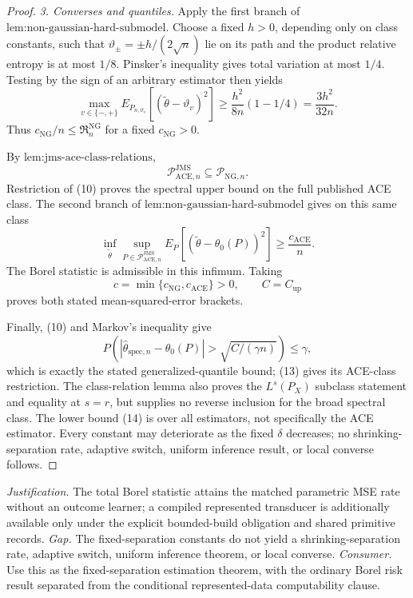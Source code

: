 \documentclass{article}
\begin{document}
\begin{proof}
\emph{3. Converses and quantiles.}
Apply the first branch of \(\text{lem:non-gaussian-hard-submodel}\).  Choose
a fixed \(h>0\), depending only on class constants, such that
\(\vartheta_{\pm}=\pm h/(2\sqrt n)\) lie on its path and the product
relative entropy is at most \(1/8\).  Pinsker's inequality gives total
variation at most \(1/4\).  Testing by the sign of an arbitrary estimator
then yields
\[
 \max_{v\in\{-,+\}}
 E_{P_{n,\vartheta_v}}[(\widetilde\theta-\vartheta_v)^2]
 \ge\frac{h^2}{8n}(1-1/4)
 =\frac{3h^2}{32n}.                                               \tag{12}
\]
Thus \(c_{\mathrm{NG}}/n\le\mathfrak R_n^{\mathrm{NG}}\) for a fixed
\(c_{\mathrm{NG}}>0\).

By \(\text{lem:jms-ace-class-relations}\),
\[
 \mathcal P_{\mathrm{ACE},n}^{\mathrm{JMS}}
 \subseteq\mathcal P_{\mathrm{NG},n}.                            \tag{13}
\]
Restriction of (10) proves the spectral upper bound on the full published
ACE class.  The second branch of
\(\text{lem:non-gaussian-hard-submodel}\) gives on this same class
\[
 \inf_{\widetilde\theta}
 \sup_{P\in\mathcal P_{\mathrm{ACE},n}^{\mathrm{JMS}}}
 E_P[(\widetilde\theta-\theta_0(P))^2]
 \ge\frac{c_{\mathrm{ACE}}}{n}.                                  \tag{14}
\]
The Borel statistic is admissible in this infimum.  Taking
\[
 c=\min\{c_{\mathrm{NG}},c_{\mathrm{ACE}}\}>0,
 \qquad C=C_{\mathrm{up}}
\]
proves both stated mean-squared-error brackets.

Finally, (10) and Markov's inequality give
\[
 P\!\left(
 |\widehat\theta_{\mathrm{spec},n}-\theta_0(P)|
 >\sqrt{C/(\gamma n)}
 \right)\le\gamma,
\]
which is exactly the stated generalized-quantile bound; (13) gives its
ACE-class restriction.  The class-relation lemma also proves the
\(L^s(P_X)\) subclass statement and equality at \(s=r\), but supplies no
reverse inclusion for the broad spectral class.  The lower bound (14) is
over all estimators, not specifically the ACE estimator.  Every constant may
deteriorate as the fixed \(\delta\) decreases; no shrinking-separation rate,
adaptive switch, uniform inference result, or local converse follows.
\end{proof}
\par\smallskip\noindent \textit{Justification.} The total Borel statistic attains the matched parametric MSE rate without an outcome learner; a compiled represented transducer is additionally available only under the explicit bounded-build obligation and shared primitive records. \textit{Gap.} The fixed-separation constants do not yield a shrinking-separation rate, adaptive switch, uniform inference theorem, or local converse. \textit{Consumer.} Use this as the fixed-separation estimation theorem, with the ordinary Borel risk result separated from the conditional represented-data computability clause.
\end{document}

